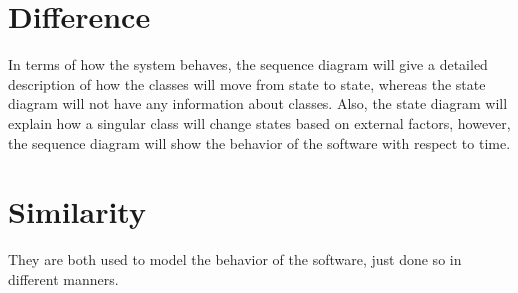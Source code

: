 	\part{Difference}
		In terms of how the system behaves, the sequence diagram will give a detailed description of how the classes will move from state to state, whereas the state diagram will not have any information about classes. Also, the state diagram will explain how a singular class will change states based on external factors, however, the sequence diagram will show the behavior of the software with respect to time.
	
	\part{Similarity}
		They are both used to model the behavior of the software, just done so in different manners.

